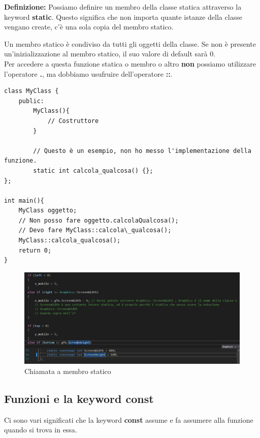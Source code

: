 \textsf{\small \textbf{Definizione: } Possiamo definire un membro della classe statica attraverso la keyword \textbf{static}. Questo significa che non importa quante istanze della classe vengano create, c'è una sola copia del membro statico.}

\textsf{\small Un membro statico è condiviso da tutti gli oggetti della classe. Se non è presente un'inizializzazione al membro statico, il suo valore di default sarà 0.} \\ 

\textsf{\small Per accedere a questa funzione statica o membro o altro \textbf{non} possiamo utilizzare l'operatore \textbf{.}, ma dobbiamo usufruire dell'operatore \textbf{::}.} \\

\begin{lstlisting}
class MyClass {
	public:
		MyClass(){
			// Costruttore
		}	
	
		// Questo è un esempio, non ho messo l'implementazione della funzione.
		static int calcola_qualcosa() {};
};

int main(){
	MyClass oggetto;
	// Non posso fare oggetto.calcolaQualcosa();
	// Devo fare MyClass::calcola\_qualcosa();
	MyClass::calcola_qualcosa();
	return 0;
}
\end{lstlisting}

\begin{figure}[H]
	\centering
	\includegraphics[width=1.2\textwidth, height=1.2\textheight, keepaspectratio]{./imgs/Class__static_type2.png}
	\caption{Chiamata a membro statico}
	\label{fig:class_static_type}
\end{figure}

\subsection{Funzioni e la keyword const}

\textsf{\small Ci sono vari significati che la keyword \textbf{const} assume e fa assumere alla funzione quando si trova in essa.} \\

